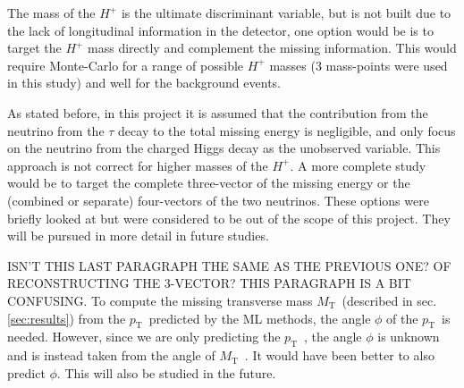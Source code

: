 \documentclass{scrartcl}
\newcommand{\pt}{\ensuremath{p_\text{T}}~}
\newcommand{\mt}{\ensuremath{M_\text{T}}~}
\begin{document}
The mass of the $H^+$ is the ultimate discriminant variable, but is not built due to the lack of longitudinal information in the detector, one option would be is to target the $H^+$ mass directly and complement the missing information. This would require Monte-Carlo for a range of possible $H^+$ masses (3 mass-points were used in this study) and well for the background events. 

As stated before, in this project it is assumed that the contribution from the neutrino from the $\tau$ decay to the total missing energy is negligible, and only focus on the neutrino from the charged Higgs decay as the unobserved variable. This approach is not correct for higher masses of the $H^+$. A more complete study would be to target the complete three-vector of the missing energy or the (combined or separate) four-vectors of the two neutrinos. These options were briefly looked at but were considered to be out of the scope of this project. They will be pursued in more detail in future studies.

ISN'T THIS LAST PARAGRAPH THE SAME AS THE PREVIOUS ONE? OF RECONSTRUCTING THE 3-VECTOR? THIS PARAGRAPH IS A BIT CONFUSING.
To compute the missing transverse mass \mt (described in sec. \ref{sec:results}) from the \pt predicted by the \gls{ML} methods, the angle $\phi$ of the \pt is needed. However, since we are only predicting the \pt, the angle $\phi$ is unknown and is instead taken from the angle of \mt. It would have been better to also predict $\phi$. This will also be studied in the future.



\end{document}
